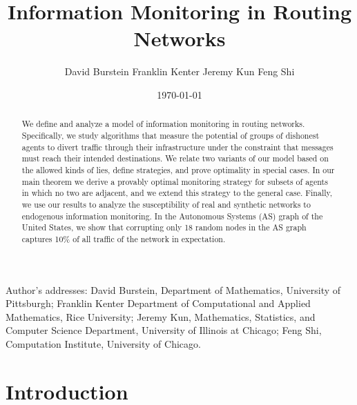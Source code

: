 \documentclass[prodmode,acmec]{ec-acmsmall}
\begin{document}
\title{Information Monitoring in Routing Networks}
\author{David Burstein
Franklin Kenter
Jeremy Kun
Feng Shi
}

\date{\today}



\begin{abstract}

We define and analyze a model of information monitoring in routing networks.
Specifically, we study algorithms that measure the potential of groups of
dishonest agents to divert traffic through their infrastructure under the
constraint that messages must reach their intended destinations. We relate two
variants of our model based on the allowed kinds of lies, define strategies,
and prove optimality in special cases. In our main theorem we derive a provably
optimal monitoring strategy for subsets of agents in which no two are adjacent,
and we extend this strategy to the general case. Finally, we use our results to
analyze the susceptibility of real and synthetic networks to endogenous
information monitoring. In the Autonomous Systems (AS) graph of the United
States, we show that corrupting only 18 random nodes in the AS graph captures
10\% of all traffic of the network in expectation.

\end{abstract}

\begin{bottomstuff}
Author's addresses: David Burstein, Department of Mathematics, University of
Pittsburgh; Franklin Kenter Department of Computational and Applied
Mathematics, Rice University; Jeremy Kun, Mathematics, Statistics, and Computer
Science Department, University of Illinois at Chicago; Feng Shi, Computation
Institute, University of Chicago.
\end{bottomstuff}


\maketitle

\section{Introduction}
\end{document}
